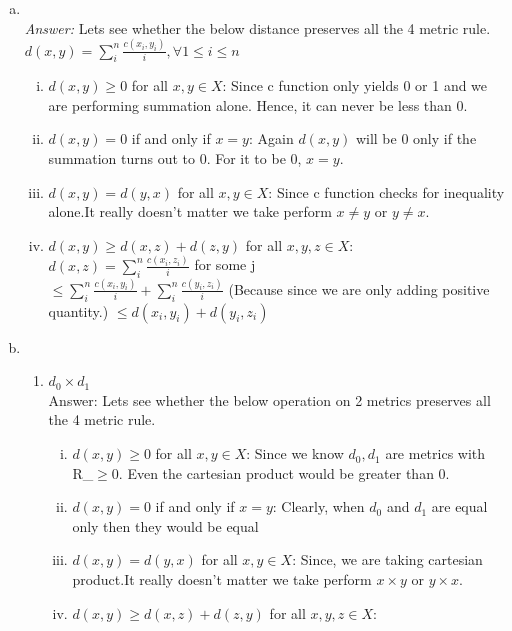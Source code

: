\documentclass{article}
\begin{document}
\begin{enumerate}
\begin{enumerate}[(a)]
			\item \\
			\emph{Answer:} Lets see whether the below distance preserves all the 4 metric rule. \\
			$d(x,y) = \sum^{n}_{i} \frac{c(x_{i}, y_{i})}{i}, \forall 1 \le i \le n$
			\begin{enumerate}[(i)]
			\item $d(x, y) \ge 0$ for all $x, y \in X$: Since c function only yields 0 or 1 and we are performing summation alone. Hence, it can never be less than 0.
			\item $d(x, y) = 0$ if and only if  $x = y$: Again $d(x,y)$ will be 0 only if the summation turns out to 0. For it to be 0, $x=y$.
			\item $d(x, y) = d(y, x)$ for all $x, y \in X$:  Since c function checks for inequality alone.It really doesn't matter we take perform $x\neq y$ or $y\neq x$.
			\item $d(x, y) \ge d(x, z) + d(z, y)$ for all $x, y, z \in X$: \\
				$d(x, z) = \sum^{n}_{i} \frac{c(x_{i}, z_{i})}{i}$ for some j \\		
						 $\le \sum^{n}_{i} \frac{c(x_{i}, y_{i})}{i} + \sum^{n}_{i} \frac{c(y_{i}, z_{i})}{i}$ (Because since we are only adding positive quantity.)
						 $\le d(x_i,y_i) + d(y_i,z_i)$
			\end{enumerate}

			\item \\
			\begin{enumerate}
				\item  $d_0 \times d_1$ \\
				Answer: Lets see whether the below operation on 2 metrics preserves all the 4 metric rule. \\	
			\begin{enumerate}[(i)]
			\item $d(x, y) \ge 0$ for all $x, y \in X$: Since we know $d_0, d_1$ are metrics with R_{$\ge 0$}. Even the cartesian product would be greater than 0.
			\item $d(x, y) = 0$ if and only if  $x = y$: Clearly, when $d_0$ and  $d_1$ are equal only then they would be equal
			\item $d(x, y) = d(y, x)$ for all $x, y \in X$:  Since, we are taking cartesian product.It really doesn't matter we take perform $x\times y$ or $y\times x$.
			\item $d(x, y) \ge d(x, z) + d(z, y)$ for all $x, y, z \in X$: \\
			\end{enumerate}
		

\end{enumerate}
\end{enumerate}
\end{enumerate}
\end{document}
